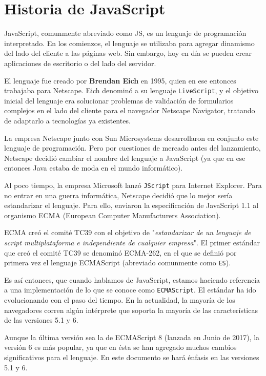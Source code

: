 
\section{Historia de JavaScript}

JavaScript, comunmente abreviado como \textsc{JS}, es un lenguaje de programación interpretado. En los comienzos, el lenguaje se utilizaba para agregar dinamismo del lado del cliente a las páginas web. Sin embargo, hoy en día se pueden crear aplicaciones de escritorio o del lado del servidor.

El lenguaje fue creado por \textbf{Brendan Eich} en 1995, quien en ese entonces trabajaba para Netscape. Eich denominó a su lenguaje \texttt{LiveScript}, y el objetivo inicial del lenguaje era solucionar problemas de validación de formularios complejos en el lado del cliente para el navegador Netscape Navigator, tratando de adaptarlo a tecnologías ya existentes. 

La empresa Netscape junto con Sun Microsystems desarrollaron en conjunto este lenguaje de programación. Pero por cuestiones de mercado antes del lanzamiento, Netscape decidió cambiar el nombre del lenguaje a JavaScript (ya que en ese entonces Java estaba de moda en el mundo informático).

Al poco tiempo, la empresa Microsoft lanzó \texttt{JScript} para Internet Explorer. Para no entrar en una guerra informática, Netscape decidió que lo mejor sería estandarizar el lenguaje. Para ello, enviaron la especificación de JavaScript 1.1 al organismo ECMA (European Computer Manufacturers Association).

ECMA creó el comité TC39 con el objetivo de "\emph{estandarizar de un lenguaje de script multiplataforma e independiente de cualquier empresa}". El primer estándar que creó el comité TC39 se denominó ECMA-262, en el que se definió por primera vez el lenguaje ECMAScript (abreviado comunmente como \texttt{ES}).

Es así entonces, que cuando hablamos de JavaScript, estamos haciendo referencia a una implementación de lo que se conoce como \texttt{ECMAScript}. El estándar ha ido evolucionando con el paso del tiempo. En la actualidad, la mayoría de los navegadores corren algún intérprete que soporta la mayoría de las características de las versiones 5.1 y 6. 

Aunque la última versión sea la de ECMAScript 8 (lanzada en Junio de 2017), la versión 6 es más popular, ya que en ésta se han agregado muchos cambios significativos para el lenguaje. En este documento se hará énfasis en las versiones 5.1 y 6.

